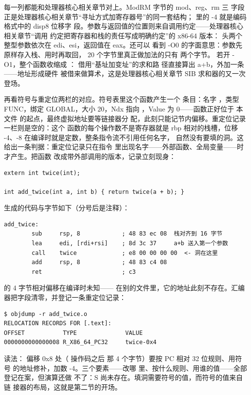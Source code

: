 每一列都能和处理器核心相关章节对上。ModRM 字节的 mod、reg、rm 三
字段正是处理器核心相关章节“寻址方式加寄存器号”的同一套结构；
\code{[rbp-4]} 里的 -4 就是编码格式中的 disp8 位移字
段。参数与返回值的位置则来自调用约定——处理器核心相关章节“调用
约定把寄存器和栈的责任写成明确约定”的 x86-64 版本：
头两个整型参数依次在 edi、esi，返回值在 eax。还可以
看到 -O0 的字面意思：参数先原样存入栈、用时再取回，
20 个字节里真正做加法的只有  两个字节。
若开 -O1，整个函数收缩成 ：
 借用“基址加变址”的求和路
径直接算出 a+b，外加一条 ——地址形成硬件
被借来做算术，这是处理器核心相关章节 SIB 求和器的又一次登场。

再看符号与重定位两栏的对应。符号表里这个函数产生一个
条目：名字 ，类型 FUNC，绑定 GLOBAL，大小
20，Ndx 指向 ，Value 为 0——函数正好位于
本文件  的起点，最终虚拟地址要等链接器分
配，此刻只能记节内偏移。重定位记录一栏则是空的：这个
函数的每个操作数不是寄存器就是 rbp 相对的栈槽，位移
-4、-8 在编译时就是定数，整条指令流不引用任何名字，
自然没有要填的洞。这给出一条判据：重定位记录只在指令
里出现名字——外部函数、全局变量——时才产生。把函数
改成带外部调用的版本，记录立刻现身：

\begin{lstlisting}
extern int twice(int);

int add_twice(int a, int b) { return twice(a + b); }
\end{lstlisting}

 生成的代码与字节如下（分号后是注释）：

\begin{lstlisting}
add_twice:
        sub     rsp, 8            ; 48 83 ec 08  栈对齐到 16 字节
        lea     edi, [rdi+rsi]    ; 8d 3c 37     a+b 送入第一个参数
        call    twice             ; e8 00 00 00 00  <- 洞在这里
        add     rsp, 8            ; 48 83 c4 08
        ret                       ; c3
\end{lstlisting}

 的 4 字节相对偏移在编译时未知——
 在别的文件里，它的地址此刻不存在。汇编
器把字段清零，并登记一条重定位记录：

\begin{lstlisting}
$ objdump -r add_twice.o
RELOCATION RECORDS FOR [.text]:
OFFSET           TYPE              VALUE
0000000000000008 R_X86_64_PC32     twice-0x4
\end{lstlisting}

读法： 偏移 0x8 处（ 操作码之后
那 4 个字节）要按 PC 相对 32 位规则、用符号
 的地址修补，加数 -4。三个要素——改哪
里、按什么规则、用谁的值——全部登记在案，但演算还做
不了：S 尚未存在。填洞需要符号的值，而符号的值来自链
接器的布局，这就是第二节的开场。

